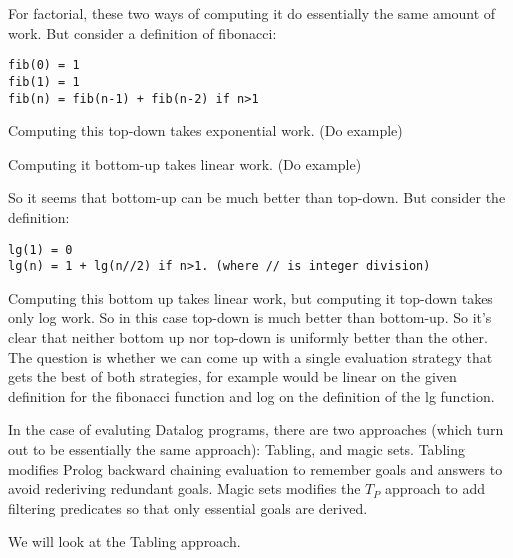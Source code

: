 For factorial, these two ways of computing it do essentially the same
amount of work.  But consider a definition of fibonacci:

\begin{verbatim}
fib(0) = 1
fib(1) = 1
fib(n) = fib(n-1) + fib(n-2) if n>1
\end{verbatim}

Computing this top-down takes exponential work.  (Do example)

Computing it bottom-up takes linear work. (Do example)

So it seems that bottom-up can be much better than top-down.  But
consider the definition:

\begin{verbatim}
lg(1) = 0
lg(n) = 1 + lg(n//2) if n>1. (where // is integer division)
\end{verbatim}

Computing this bottom up takes linear work, but computing it top-down
takes only log work.  So in this case top-down is much better than
bottom-up.  So it's clear that neither bottom up nor top-down is
uniformly better than the other.  The question is whether we can come
up with a single evaluation strategy that gets the best of both
strategies, for example would be linear on the given definition for
the fibonacci function and log on the definition of the lg function.

In the case of evaluting Datalog programs, there are two approaches
(which turn out to be essentially the same approach): Tabling, and
magic sets.  Tabling modifies Prolog backward chaining evaluation to
remember goals and answers to avoid rederiving redundant goals.  Magic
sets modifies the $T_P$ approach to add filtering predicates so that only
essential goals are derived.

We will look at the Tabling approach.

